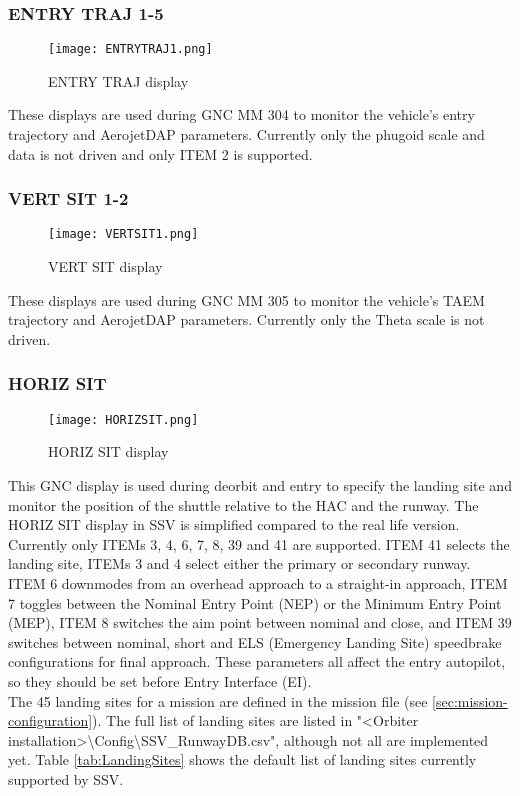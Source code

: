 \documentclass[Space_Shuttle_Vessel_Manual.tex]{subfiles}
\begin{document}
\begin{multicols*}{2}
\subsubsection{ENTRY TRAJ 1-5}
\begin{figure}[H]
  \texttt{[image: ENTRYTRAJ1.png]}
  \caption{ENTRY TRAJ display}
  \label{fig:ENTRY_TRAJ}
\end{figure}
These displays are used during GNC MM 304 to monitor the vehicle's entry trajectory and AerojetDAP parameters. Currently only the phugoid scale and data is not driven and only ITEM 2 is supported.

\subsubsection{VERT SIT 1-2}
\begin{figure}[H]
  \texttt{[image: VERTSIT1.png]}
  \caption{VERT SIT display}
  \label{fig:VERT_SIT}
\end{figure}
These displays are used during GNC MM 305 to monitor the vehicle's TAEM trajectory and AerojetDAP parameters. Currently only the Theta scale is not driven.

\subsubsection{HORIZ SIT}
\begin{figure}[H]
  \texttt{[image: HORIZSIT.png]}
  \caption{HORIZ SIT display}
  \label{fig:HORIZ_SIT}
\end{figure}
This GNC display is used during deorbit and entry to specify the landing site and monitor the position of the shuttle relative to the HAC and the runway.
The HORIZ SIT display in SSV is simplified compared to the real life version.
Currently only ITEMs 3, 4, 6, 7, 8, 39 and 41 are supported.
ITEM 41 selects the landing site, ITEMs 3 and 4 select either the primary or secondary runway. ITEM 6 downmodes from an overhead approach to a straight-in approach, ITEM 7 toggles between the Nominal Entry Point (NEP) or the Minimum Entry Point (MEP), ITEM 8 switches the aim point between nominal and close, and ITEM 39 switches between nominal, short and ELS (Emergency Landing Site) speedbrake configurations for final approach.
These parameters all affect the entry autopilot, so they should be set before Entry Interface (EI).\\
The 45 landing sites for a mission are defined in the mission file (see \ref{sec:mission-configuration}). The full list of landing sites are listed in "<Orbiter installation>\textbackslash Config\textbackslash SSV\_RunwayDB.csv", although not all are implemented yet. Table \ref{tab:LandingSites} shows the default list of landing sites currently supported by SSV.


\end{multicols*}
\end{document}
